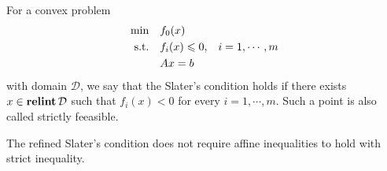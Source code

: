 \documentclass[12pt]{article}
\begin{document}
\begin{definition}\label{slater}
    For a convex problem
    \begin{equation}\label{convexproblem}
        \begin{aligned}
            \min\quad & f_0(x) &\\
            \textnormal{s.t.}\quad & f_i(x)\leqslant 0, & i=1,\cdots,m\\
            & Ax=b
        \end{aligned}
    \end{equation}
    with domain \(\mathcal D\), we say that the \textnormal{Slater's condition} holds if there exists \(x\in\operatorname{\mathbf{relint}}\mathcal D\) such that \(f_i(x)<0\) for every \(i=1,\cdots,m\). Such a point is also called \textnormal{strictly feeasible}.
\end{definition}

\begin{definition}
    The refined Slater's condition does not require affine inequalities to hold with strict inequality.
\end{definition}
\end{document}
